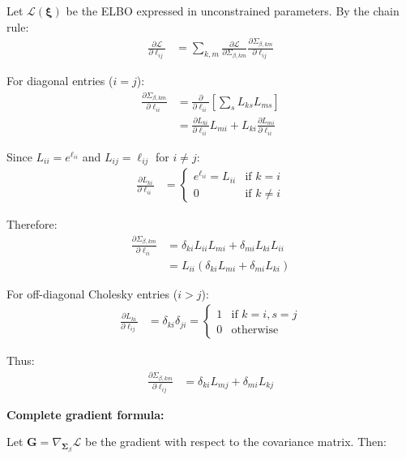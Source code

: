 \documentclass[11pt]{article}
\begin{document}
Let $\mathcal{L}(\bm{\xi})$ be the ELBO expressed in unconstrained parameters. By the chain rule:
\begin{align}
\frac{\partial \mathcal{L}}{\partial \ell_{ij}} &= \sum_{k,m} \frac{\partial \mathcal{L}}{\partial \Sigma_{\beta,km}} \frac{\partial \Sigma_{\beta,km}}{\partial \ell_{ij}}
\end{align}

For diagonal entries ($i=j$):
\begin{align}
\frac{\partial \Sigma_{\beta,km}}{\partial \ell_{ii}} &= \frac{\partial}{\partial \ell_{ii}} \left[\sum_s L_{ks} L_{ms}\right]\\
&= \frac{\partial L_{ki}}{\partial \ell_{ii}} L_{mi} + L_{ki} \frac{\partial L_{mi}}{\partial \ell_{ii}}
\end{align}

Since $L_{ii} = e^{\ell_{ii}}$ and $L_{ij} = \ell_{ij}$ for $i \ne j$:
\begin{align}
\frac{\partial L_{ki}}{\partial \ell_{ii}} &= \begin{cases}
e^{\ell_{ii}} = L_{ii} & \text{if } k = i\\
0 & \text{if } k \ne i
\end{cases}
\end{align}

Therefore:
\begin{align}
\frac{\partial \Sigma_{\beta,km}}{\partial \ell_{ii}} &= \delta_{ki} L_{ii} L_{mi} + \delta_{mi} L_{ki} L_{ii}\\
&= L_{ii} (\delta_{ki} L_{mi} + \delta_{mi} L_{ki})
\end{align}

For off-diagonal Cholesky entries ($i > j$):
\begin{align}
\frac{\partial L_{ki}}{\partial \ell_{ij}} &= \delta_{ki} \delta_{ji} = \begin{cases}
1 & \text{if } k=i, s=j\\
0 & \text{otherwise}
\end{cases}
\end{align}

Thus:
\begin{align}
\frac{\partial \Sigma_{\beta,km}}{\partial \ell_{ij}} &= \delta_{ki} L_{mj} + \delta_{mi} L_{kj}
\end{align}

\textbf{Complete gradient formula:}

Let $\bm{G} = \nabla_{\bm{\Sigma}_\beta} \mathcal{L}$ be the gradient with respect to the covariance matrix. Then:
\end{document}
